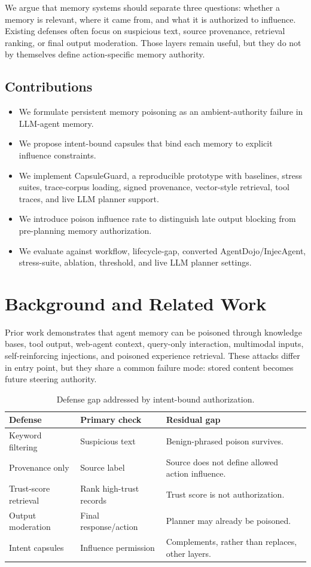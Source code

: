 \documentclass[conference]{IEEEtran}
\begin{document}
We argue that memory systems should separate three questions: whether a memory is relevant, where it came from, and what it is authorized to influence. Existing defenses often focus on suspicious text, source provenance, retrieval ranking, or final output moderation. Those layers remain useful, but they do not by themselves define action-specific memory authority.

\subsection{Contributions}
\begin{itemize}
\item We formulate persistent memory poisoning as an ambient-authority failure in LLM-agent memory.
\item We propose intent-bound capsules that bind each memory to explicit influence constraints.
\item We implement CapsuleGuard, a reproducible prototype with baselines, stress suites, trace-corpus loading, signed provenance, vector-style retrieval, tool traces, and live LLM planner support.
\item We introduce poison influence rate to distinguish late output blocking from pre-planning memory authorization.
\item We evaluate against workflow, lifecycle-gap, converted AgentDojo/InjecAgent, stress-suite, ablation, threshold, and live LLM planner settings.
\end{itemize}
\section{Background and Related Work}
Prior work demonstrates that agent memory can be poisoned through knowledge bases, tool output, web-agent context, query-only interaction, multimodal inputs, self-reinforcing injections, and poisoned experience retrieval. These attacks differ in entry point, but they share a common failure mode: stored content becomes future steering authority.

\begin{table}[t]
\centering
\scriptsize
\caption{Defense gap addressed by intent-bound authorization.}
\begin{tabular}{lll}
\hline
Defense & Primary check & Residual gap \\
\hline
Keyword filtering & Suspicious text & Benign-phrased poison survives. \\
Provenance only & Source label & Source does not define allowed action influence. \\
Trust-score retrieval & Rank high-trust records & Trust score is not authorization. \\
Output moderation & Final response/action & Planner may already be poisoned. \\
Intent capsules & Influence permission & Complements, rather than replaces, other layers. \\
\hline
\end{tabular}
\end{table}
\end{document}
